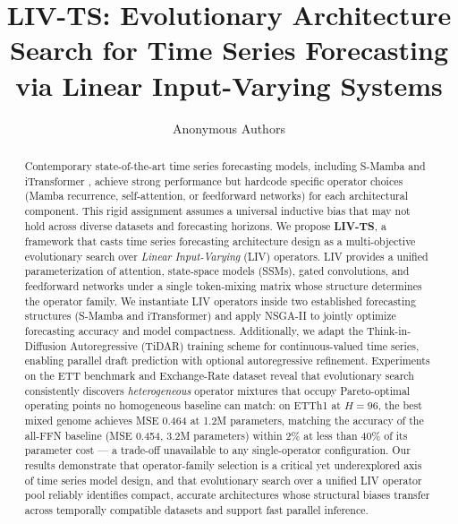 \documentclass[conference]{IEEEtran}
\begin{document}
\title{LIV-TS: Evolutionary Architecture Search for Time Series Forecasting via Linear Input-Varying Systems}

\author{Anonymous Authors}

\maketitle

\begin{abstract}
Contemporary state-of-the-art time series forecasting models, including S-Mamba \cite{wang2024smamba} and iTransformer \cite{liu2024itransformer}, achieve strong performance but hardcode specific operator choices (Mamba recurrence, self-attention, or feedforward networks) for each architectural component.
This rigid assignment assumes a universal inductive bias that may not hold across diverse datasets and forecasting horizons.
We propose \textbf{LIV-TS}, a framework that casts time series forecasting architecture design as a multi-objective evolutionary search over \emph{Linear Input-Varying} (LIV) \cite{massaroli2024liv} operators.
LIV provides a unified parameterization of attention, state-space models (SSMs), gated convolutions, and feedforward networks under a single token-mixing matrix whose structure determines the operator family.
We instantiate LIV operators inside two established forecasting structures (S-Mamba and iTransformer) and apply NSGA-II \cite{deb2002nsga2} to jointly optimize forecasting accuracy and model compactness.
Additionally, we adapt the Think-in-Diffusion Autoregressive (TiDAR) \cite{tidar2024} training scheme for continuous-valued time series, enabling parallel draft prediction with optional autoregressive refinement.
Experiments on the ETT benchmark and Exchange-Rate dataset reveal that evolutionary search consistently discovers \emph{heterogeneous} operator mixtures that occupy Pareto-optimal operating points no homogeneous baseline can match: on ETTh1 at $H\!=\!96$, the best mixed genome achieves MSE 0.464 at 1.2M parameters, matching the accuracy of the all-FFN baseline (MSE 0.454, 3.2M parameters) within 2\% at less than 40\% of its parameter cost --- a trade-off unavailable to any single-operator configuration.
Our results demonstrate that operator-family selection is a critical yet underexplored axis of time series model design, and that evolutionary search over a unified LIV operator pool reliably identifies compact, accurate architectures whose structural biases transfer across temporally compatible datasets and support fast parallel inference.
\end{abstract}
\end{document}
